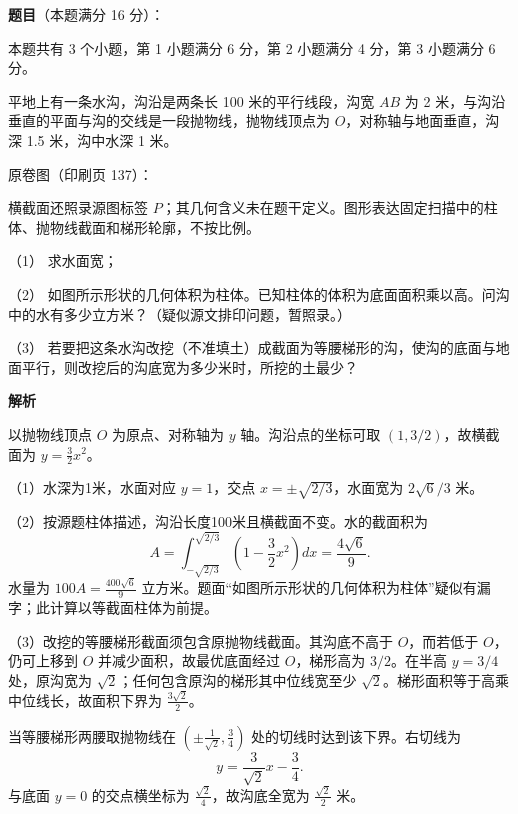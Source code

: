 \begin{answer}

\textbf{题目}（本题满分 16 分）：

本题共有 3 个小题，第 1 小题满分 6 分，第 2 小题满分 4 分，第 3 小题满分 6 分。

平地上有一条水沟，沟沿是两条长 100 米的平行线段，沟宽 $AB$ 为 2 米，与沟沿垂直的平面与沟的交线是一段抛物线，抛物线顶点为 $O$，对称轴与地面垂直，沟深 1.5 米，沟中水深 1 米。

原卷图（印刷页 137）：
\nopagebreak[4]
\begin{center}\end{center}
\nopagebreak[4]
\nopagebreak[4]
\begin{center}\end{center}
\nopagebreak[4]
横截面还照录源图标签 $P$；其几何含义未在题干定义。图形表达固定扫描中的柱体、抛物线截面和梯形轮廓，不按比例。

（1） 求水面宽；

（2） 如图所示形状的几何体积为柱体。已知柱体的体积为底面面积乘以高。问沟中的水有多少立方米？（疑似源文排印问题，暂照录。）

（3） 若要把这条水沟改挖（不准填土）成截面为等腰梯形的沟，使沟的底面与地面平行，则改挖后的沟底宽为多少米时，所挖的土最少？

\textbf{解析}

以抛物线顶点 $O$ 为原点、对称轴为 $y$ 轴。沟沿点的坐标可取 $(1,3/2)$，故横截面为 $y=\frac32x^2$。


（1）水深为1米，水面对应 $y=1$，交点 $x=\pm\sqrt{2/3}$，水面宽为 $2\sqrt6/3$ 米。


（2）按源题柱体描述，沟沿长度100米且横截面不变。水的截面积为
\nopagebreak[4]
\[
A=\int_{-\sqrt{2/3}}^{\sqrt{2/3}}\left(1-\frac32x^2\right)dx
=\frac{4\sqrt6}{9}.
\]
水量为 $100A=\frac{400\sqrt6}{9}$ 立方米。题面“如图所示形状的几何体积为柱体”疑似有漏字；此计算以等截面柱体为前提。


（3）改挖的等腰梯形截面须包含原抛物线截面。其沟底不高于 $O$，而若低于 $O$，仍可上移到 $O$ 并减少面积，故最优底面经过 $O$，梯形高为 $3/2$。在半高 $y=3/4$ 处，原沟宽为 $\sqrt2$；任何包含原沟的梯形其中位线宽至少 $\sqrt2$。梯形面积等于高乘中位线长，故面积下界为 $\frac{3\sqrt2}{2}$。

当等腰梯形两腰取抛物线在 $\left(\pm\frac1{\sqrt2},\frac34\right)$ 处的切线时达到该下界。右切线为
\nopagebreak[4]
\[
y=\frac3{\sqrt2}x-\frac34.
\]
与底面 $y=0$ 的交点横坐标为 $\frac{\sqrt2}{4}$，故沟底全宽为 $\frac{\sqrt2}{2}$ 米。




\end{answer}

